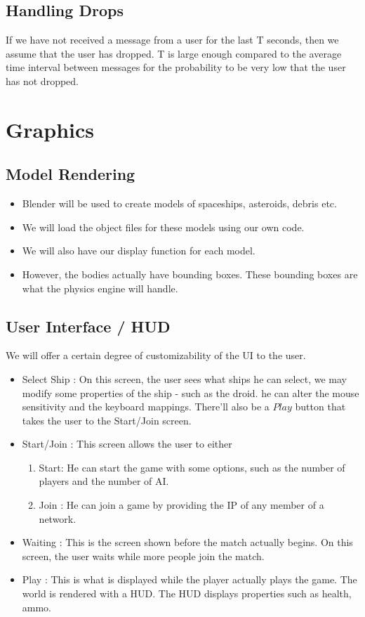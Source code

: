 \documentclass[]{article}
\begin{document}
\subsection{Handling Drops}
If we have not received a message from a user for the last T seconds, then we assume that the user has dropped. T is large enough compared to the average time interval between messages for the probability to be very low that the user has not dropped.




\section{Graphics}
\subsection{Model Rendering}
\begin{itemize}
\item Blender will be used to create models of spaceships, asteroids, debris etc.
\item We will load the object files for these models using our own code.
\item We will also have our display function for each model.
\item However, the bodies actually have bounding boxes. These bounding boxes are what the physics engine will handle.
\end{itemize}

\subsection{User Interface / HUD}
We will offer a certain degree of customizability of the UI to the user. 
\begin{itemize}
\item Select Ship : On this screen, the user sees what ships he can select, we may modify some properties of the ship - such as the droid. he can alter the mouse sensitivity and the keyboard mappings. There'll also be a $Play$ button that takes the user to the Start/Join screen.
\item Start/Join : This screen allows the user to either
	\begin{enumerate}
	\item Start: He can start the game with some options, such as the number of players and the number of AI.
	\item Join : He can join a game by providing the IP of any member of a network.
	\end{enumerate}
\item Waiting : This is the screen shown before the match actually begins. On this screen, the user waits while more people join the match.
	\item Play : This is what is displayed while the player actually plays the game. The world is rendered with a HUD. The HUD displays properties such as health, ammo.	
\end{itemize}
\end{document}
